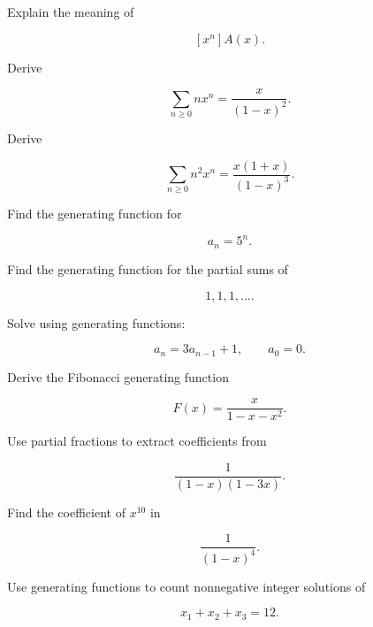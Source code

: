 \begin{exercise}[1]
Explain the meaning of

\[
[x^n]A(x).
\]
\end{exercise}

\begin{exercise}[2]
Derive

\[
\sum_{n\geq0}nx^n
=
\frac{x}{(1-x)^2}.
\]
\end{exercise}

\begin{exercise}[2]
Derive

\[
\sum_{n\geq0}n^2x^n
=
\frac{x(1+x)}{(1-x)^3}.
\]
\end{exercise}

\begin{exercise}[2]
Find the generating function for

\[
a_n=5^n.
\]
\end{exercise}

\begin{exercise}[2]
Find the generating function for the partial sums of

\[
1,1,1,\ldots.
\]
\end{exercise}

\begin{exercise}[2]
Solve using generating functions:

\[
a_n=3a_{n-1}+1,
\qquad
a_0=0.
\]
\end{exercise}

\begin{exercise}[2]
Derive the Fibonacci generating function

\[
F(x)=\frac{x}{1-x-x^2}.
\]
\end{exercise}

\begin{exercise}[2]
Use partial fractions to extract coefficients from

\[
\frac{1}{(1-x)(1-3x)}.
\]
\end{exercise}

\begin{exercise}[2]
Find the coefficient of \(x^{10}\) in

\[
\frac{1}{(1-x)^4}.
\]
\end{exercise}

\begin{exercise}[2]
Use generating functions to count nonnegative integer solutions of

\[
x_1+x_2+x_3=12.
\]
\end{exercise}


